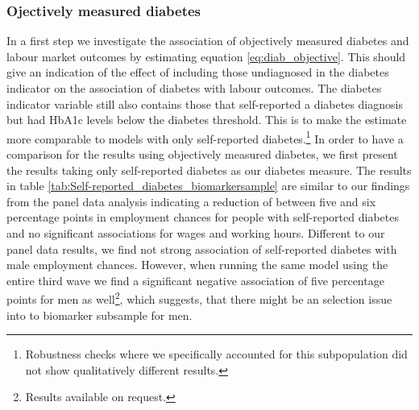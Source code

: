 \subsubsection*{Ojectively measured diabetes}
In a first step we investigate the association of objectively measured diabetes and labour market outcomes by estimating equation \ref{eq:diab_objective}. This should give an indication of the effect of including those undiagnosed in the diabetes indicator on the association of diabetes with labour outcomes. The diabetes indicator variable still also contains those that self-reported a diabetes diagnosis but had \ac{HbA1c} levels below the diabetes threshold. This is to make the estimate more comparable to models with only self-reported diabetes.\footnote{Robustness checks where we specifically accounted for this subpopulation did not show qualitatively different results.} In order to have a comparison for the results using objectively measured diabetes, we first present the results taking only self-reported diabetes as our diabetes measure. The results in table \ref{tab:Self-reported_diabetes_biomarkersample} are similar to our findings from the panel data analysis indicating a reduction of between five and six percentage points in employment chances for people with self-reported diabetes and no significant associations for wages and working hours. Different to our panel data results, we find not strong association of self-reported diabetes with male employment chances. However, when running the same model using the entire third wave we find a significant negative association of five percentage points for men as well\footnote{Results available on request.}, which suggests, that there might be an selection issue into to biomarker subsample for men.

